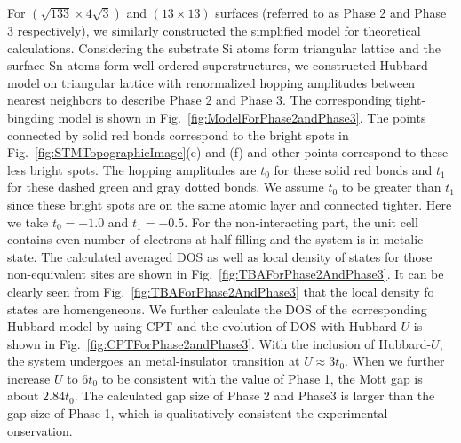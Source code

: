 \documentclass[aps,prb,amsfonts,amsmath,amssymb,showpacs,groupedaddress,superscriptaddress]{revtex4-1}
\begin{document}
For $(\sqrt{133} \times 4\sqrt{3})$ and $(13 \times 13)$ surfaces (referred to as Phase 2 and Phase 3 respectively), we similarly constructed the simplified model for theoretical calculations. Considering the substrate Si atoms form triangular lattice and the surface Sn atoms form well-ordered superstructures, we constructed Hubbard model on triangular lattice with renormalized hopping amplitudes between nearest neighbors to describe Phase 2 and Phase 3. The corresponding tight-bingding model is shown in Fig.~\ref{fig:ModelForPhase2andPhase3}. The points connected by solid red bonds correspond to the bright spots in Fig.~\ref{fig:STMTopographicImage}(e) and (f) and other points correspond to these less bright spots. The hopping amplitudes are $t_{0}$ for these solid red bonds and $t_{1}$ for these dashed green and gray dotted bonds. We assume $t_{0}$ to be greater than $t_{1}$ since these bright spots are on the same atomic layer and connected tighter. Here we take $t_{0} = -1.0$ and $t_{1} = -0.5$. For the non-interacting part, the unit cell contains even number of electrons at half-filling and the system is in metalic state. The calculated averaged DOS as well as local density of states for those non-equivalent sites are shown in Fig.~\ref{fig:TBAForPhase2AndPhase3}. It can be clearly seen from Fig.~\ref{fig:TBAForPhase2AndPhase3} that the local density fo states are homengeneous. We further calculate the DOS of the corresponding Hubbard model by using CPT and the evolution of DOS with Hubbard-$U$ is shown in Fig.~\ref{fig:CPTForPhase2andPhase3}. With the inclusion of Hubbard-$U$, the system undergoes an metal-insulator transition at $U \approx 3 t_{0}$. When we further increase $U$ to $6 t_{0}$ to be consistent with the value of Phase 1, the Mott gap is about $2.84 t_{0}$. The calculated gap size of Phase 2 and Phase3 is larger than the gap size of Phase 1, which is qualitatively consistent the experimental onservation.
\end{document}
